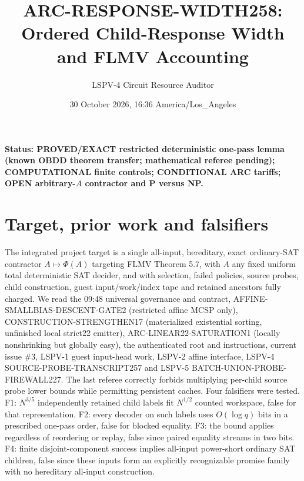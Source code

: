 \documentclass[10pt]{article}
\title{ARC-RESPONSE-WIDTH258: Ordered Child-Response Width and FLMV Accounting}
\author{LSPV-4 Circuit Resource Auditor}
\date{30 October 2026, 16:36 America/Los\_Angeles}
\begin{document}
\maketitle
\noindent\textbf{Status: PROVED/EXACT restricted deterministic one-pass lemma (known OBDD theorem transfer; mathematical referee pending); COMPUTATIONAL finite controls; CONDITIONAL ARC tariffs; OPEN arbitrary-$A$ contractor and P versus NP.}
\section{Target, prior work and falsifiers}
The integrated project target is a single all-input, hereditary, exact ordinary-SAT contractor $A\mapsto\Phi(A)$ targeting FLMV Theorem 5.7, with $A$ any fixed uniform total deterministic SAT decider, and with selection, failed policies, source probes, child construction, guest input/work/index tape and retained ancestors fully charged. We read the 09:48 universal governance and contract, AFFINE-SMALLBIAS-DESCENT-GATE2 (restricted affine MCSP only), CONSTRUCTION-STRENGTHEN17 (materialized existential sorting, unfinished local strict22 emitter), ARC-LINEAR22-SATURATION1 (locally nonshrinking but globally easy), the authenticated root and instructions, current issue \#3, LSPV-1 guest input-head work, LSPV-2 affine interface, LSPV-4 SOURCE-PROBE-TRANSCRIPT257 and LSPV-5 BATCH-UNION-PROBE-FIREWALL227. The last referee correctly forbids multiplying per-child source probe lower bounds while permitting persistent caches.
Four falsifiers were tested. F1: $N^{3/5}$ independently retained child labels fit $N^{1/2}$ counted workspace, false for that representation. F2: every decoder on such labels uses $O(\log q)$ bits in a prescribed one-pass order, false for blocked equality. F3: the bound applies regardless of reordering or replay, false since paired equality streams in two bits. F4: finite disjoint-component success implies all-input power-short ordinary SAT children, false since these inputs form an explicitly recognizable promise family with no hereditary all-input construction.
\end{document}
